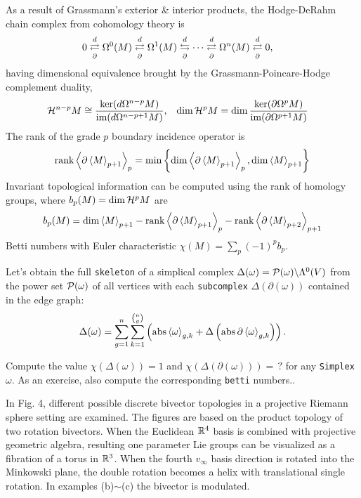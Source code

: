 \documentclass{juliacon}
\begin{document}
As a result of Grassmann's exterior \& interior products, the Hodge-DeRahm chain complex from cohomology theory is
\begin{align*}
	0 &\overset{d}{\underset{\partial}{\rightleftarrows}} \Omega^0(M) \overset{d}{\underset{\partial}{\rightleftarrows}} \Omega^1(M) \overset{d}{\underset{\partial}{\leftrightarrows}} \cdots \overset{d}{\underset{\partial}{\rightleftarrows}} \Omega^n(M) \overset{d}{\underset{\partial}{\rightleftarrows}} 0,
\end{align*}
having dimensional equivalence brought by the Grassmann-Poincare-Hodge complement duality,
\begin{align*}
	\mathcal{H}^{n-p}M &\cong \frac{\ker(d\Omega^{n-p}M)}{\text{im}(d\Omega^{n-p+1}M)}, & \dim\mathcal{H}^pM &= \dim\frac{\ker(\partial\Omega^pM)}{\text{im}(\partial\Omega^{p+1}M)}
\end{align*}
The rank of the grade $p$ boundary incidence operator is
$$ \text{rank}\left\langle \partial\left\langle M \right\rangle_{p+1} \right\rangle_p = \min\left\{ \dim\left\langle \partial\left\langle M \right\rangle_{p+1} \right\rangle_p,\dim\left\langle M \right\rangle_{p+1} \right\} $$
Invariant topological information can be computed using the rank of homology groups, where $b_p(M)=\dim\mathcal{H}^pM$ are
$$ b_p(M) = \dim\left\langle M \right\rangle_{p+1} - \text{rank}\left\langle \partial\left\langle M \right\rangle_{p+1} \right\rangle_p - \text{rank}\left\langle \partial\left\langle M \right\rangle_{p+2} \right\rangle_{p+1} $$
Betti numbers with Euler characteristic $\chi(M) = \sum_p (-1)^pb_p$.

Let's obtain the full \verb`skeleton` of a simplical complex $\Delta(\omega)=\mathcal{P}(\omega)\backslash\Lambda^0(V)$ from the power set $\mathcal{P}(\omega)$ of all vertices with each \verb`subcomplex` $\Delta(\partial(\omega))$ contained in the edge graph:
$$ \Delta(\omega) =  \sum_{g=1}^n\sum_{k=1}^{n\choose g}\left(\text{abs}\left\langle \omega \right\rangle_{g,k} + \Delta\left(\text{abs}\,\partial\left\langle \omega \right\rangle_{g,k}\right)\right). $$
\begin{example}
	[Topology] Compute the value $\chi(\Delta(\omega))=1$ and $\chi(\Delta(\partial(\omega))) = \, ?$ for any \verb`Simplex` $\omega$. As an exercise, also compute the corresponding \verb`betti` numbers..
\end{example}

In Fig. 4, different possible discrete bivector topologies in a projective Riemann sphere setting are examined. 
The figures are based on the product topology of two rotation bivectors.
When the Euclidean $\mathbb{R}^4$ basis is combined with projective geometric algebra, resulting one parameter Lie groups can be visualized as a fibration of a torus in $\mathbb{R}^3$. 
When the fourth $v_\infty$ basis direction is rotated into the Minkowski plane, the double rotation becomes a helix with translational single rotation. In examples (b)$\sim$(c) the bivector is modulated.
\end{document}
